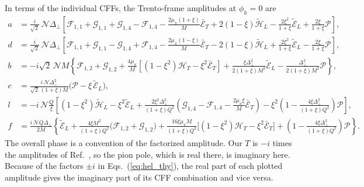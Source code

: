 \documentclass[aps,prd,showpacs,notitlepage,nofootinbib,preprintnumbers,amsmath,amssymb]{revtex4-2}
\newcommand{\cP}{\mathcal P}
\newcommand{\Dp}{\Delta_\perp}
\begin{document}
In terms of the individual CFFs, the Trento-frame amplitudes at $\phi_h=0$ are
\begin{subequations}\label{eq:hel_thy}
\begin{align}
a&=\frac{i}{\sqrt2}\,\mathcal N\Dp\left[\mathcal F_{1,1}+\mathcal G_{1,1}+\mathcal G_{1,4}-\mathcal F_{1,4}-\frac{2\mu_\pi(1+\xi)}{M}\bar{\mathcal E}_T+2(1-\xi)\tilde{\mathcal H}_L-\frac{2\xi^2}{1+\xi}\tilde{\mathcal E}_L+\frac{2\xi}{1+\xi}\cP\right],\\
d&=\frac{i}{\sqrt2}\,\mathcal N\Dp\left[\mathcal F_{1,1}+\mathcal G_{1,1}-\mathcal G_{1,4}+\mathcal F_{1,4}-\frac{2\mu_\pi(1-\xi)}{M}\bar{\mathcal E}_T-2(1-\xi)\tilde{\mathcal H}_L+\frac{2\xi^2}{1+\xi}\tilde{\mathcal E}_L-\frac{2\xi}{1+\xi}\cP\right],\\
b&=-i\sqrt2\,\mathcal NM\left\{\mathcal F_{1,2}+\mathcal G_{1,2}+\frac{4\mu_\pi}{M}\left[(1-\xi^2)\mathcal H_T-\xi^2\bar{\mathcal E}_T\right]+\frac{\xi\Dp^2}{2(1+\xi)M^2}\tilde{\mathcal E}_L-\frac{\Dp^2}{2(1+\xi)M^2}\cP\right\},\\
c&=\frac{i\,\mathcal N\Dp^2}{\sqrt2\,(1+\xi)M}\Big(\cP-\xi\,\tilde{\mathcal E}_L\Big),\\
l&=-i\,\mathcal N\frac{Q}{\xi}\left[(1-\xi^2)\tilde{\mathcal H}_L-\xi^2\tilde{\mathcal E}_L+\frac{2\xi^2\Dp^2}{(1+\xi)Q^2}\left(\mathcal G_{1,4}-\mathcal F_{1,4}-\frac{2\mu_\pi\xi}{M}\bar{\mathcal E}_T\right)-\xi^2\left(1-\frac{4\xi\Dp^2}{(1+\xi)Q^2}\right)\cP\right],\\
f&=\frac{i\,\mathcal NQ\Dp}{2M}\left\{\tilde{\mathcal E}_L+\frac{4\xi M^2}{(1+\xi)Q^2}\Big(\mathcal F_{1,2}+\mathcal G_{1,2}\Big)+\frac{16\xi\mu_\pi M}{(1+\xi)Q^2}\Big[(1-\xi^2)\mathcal H_T-\xi^2\bar{\mathcal E}_T\Big]+\left(1-\frac{4\xi\Dp^2}{(1+\xi)Q^2}\right)\cP\right\}.
\end{align}
\end{subequations}
 The overall phase is a convention of the factorized amplitude. Our $T$ is $-i$ times the amplitudes of Ref.~\cite{Goloskokov:2009ia}, so the pion pole, which is real there, is imaginary here. Because of the factors $\pm i$ in Eqs.~(\ref{eq:hel_thy}), the real part of each plotted amplitude gives the imaginary part of its CFF combination and vice versa.
\end{document}
